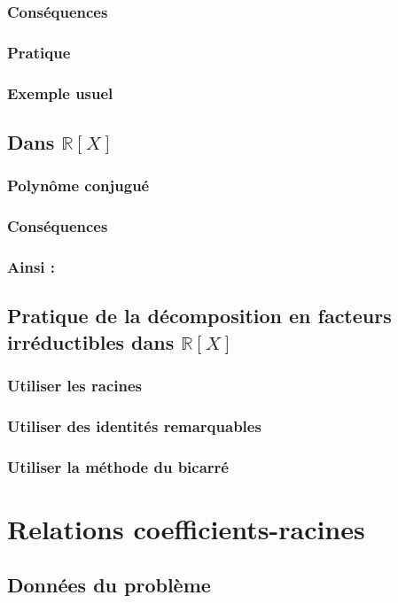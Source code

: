 \documentclass[12pt,a4paper,french]{book}
\begin{document}
			\subsubsection{Conséquences}
			\subsubsection{Pratique}
			\subsubsection{Exemple usuel}
		\subsection{Dans $\mathbb{R}[X]$}
			\subsubsection{Polynôme conjugué}
			\subsubsection{Conséquences}
			\subsubsection{Ainsi :}
		\subsection{Pratique de la décomposition en facteurs irréductibles dans $\mathbb{R}[X]$}
			\subsubsection{Utiliser les racines}
			\subsubsection{Utiliser des identités remarquables}
			\subsubsection{Utiliser la méthode du bicarré}
	\section{Relations coefficients-racines}
		\subsection{Données du problème}
\end{document}
